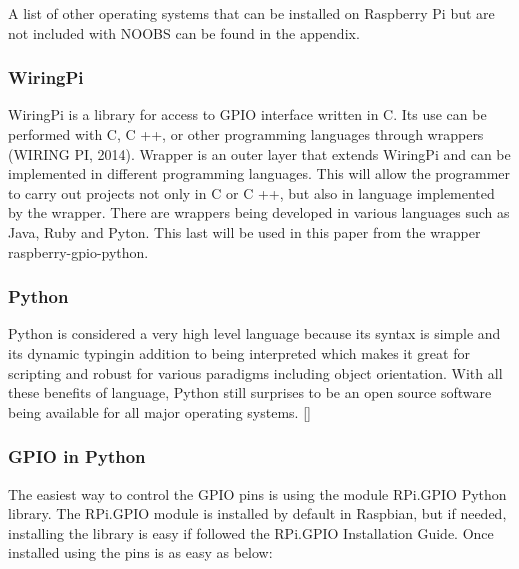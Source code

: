\documentclass{acm_proc_article-sp}
\begin{document}
A list of other operating systems that can be installed on Raspberry Pi but are not included with NOOBS can be found in the appendix.

\subsubsection{WiringPi}
WiringPi is a library for access to GPIO interface written in C. Its use can be performed with C, C ++, or other programming languages through wrappers (WIRING PI, 2014). Wrapper is an outer layer that extends WiringPi and can be implemented in different programming languages. This will allow the programmer to carry out projects not only in C or C ++, but also in language implemented by the wrapper. There are wrappers being developed in various languages such as Java, Ruby and Pyton. This last will be used in this paper from the wrapper raspberry-gpio-python.

\subsubsection{Python}
Python is considered a very high level language because its syntax is simple and its dynamic typingin addition to being interpreted which makes it great for scripting and robust for various paradigms including object orientation. With all these benefits of language, Python still surprises to be an open source software being available for all major operating systems.
[] %


\subsubsection{GPIO in Python}
The easiest way to control the GPIO pins is using the module RPi.GPIO Python library. The RPi.GPIO module is installed by default in Raspbian, but if needed, installing the library is easy if followed the RPi.GPIO Installation Guide. Once installed using the pins is as easy as below: 
\end{document}
